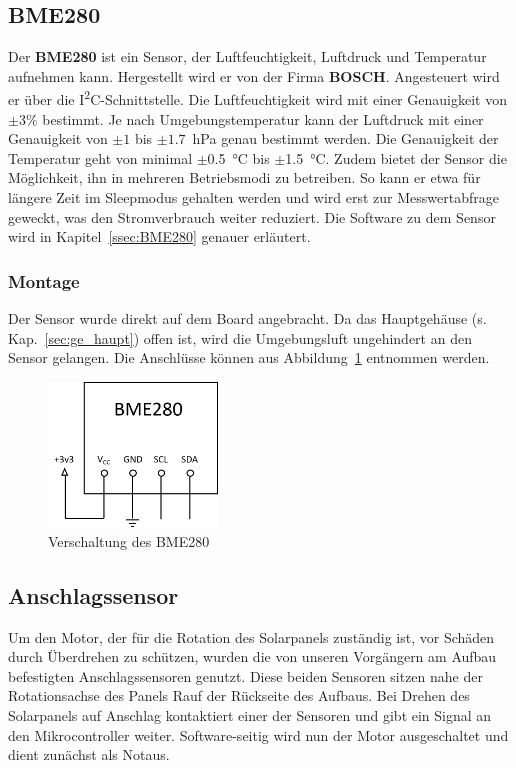 \subsection{BME280}
Der \textbf{BME280} ist ein Sensor, der Luftfeuchtigkeit, Luftdruck und Temperatur aufnehmen kann. Hergestellt wird er von der Firma \textbf{BOSCH}. Angesteuert wird er über die I\textsuperscript{2}C-Schnittstelle. Die Luftfeuchtigkeit wird mit einer Genauigkeit von $\pm3\%$ bestimmt. Je nach Umgebungstemperatur kann der Luftdruck mit einer Genauigkeit von $\pm1$ bis $\pm1.7$~hPa genau bestimmt werden. Die Genauigkeit der Temperatur geht von minimal $\pm$\SI{0.5}{\celsius} bis $\pm$\SI{1.5}{\celsius}. Zudem bietet der Sensor die Möglichkeit, ihn in mehreren Betriebsmodi zu betreiben. So kann er etwa für längere Zeit im Sleepmodus gehalten werden und wird erst zur Messwertabfrage geweckt, was den Stromverbrauch weiter reduziert. Die Software zu dem Sensor wird in Kapitel~\ref{ssec:BME280} genauer erläutert.\cite{BME280_Manual}

\subsubsection{Montage}
Der Sensor wurde direkt auf dem Board angebracht. Da das Hauptgehäuse (s. Kap.~\ref{sec:ge_haupt}) offen ist, wird die Umgebungsluft ungehindert an den Sensor gelangen. Die Anschlüsse können aus Abbildung~\ref{fig:BME280_Plan} entnommen werden.

\begin{figure}[H]
  \centering
  \includegraphics[width=0.4\textwidth]{./img/BME280_Plan.png}
  \caption{Verschaltung des BME280}\label{fig:BME280_Plan}
\end{figure}

\subsection{Anschlagssensor}
Um den Motor, der für die Rotation des Solarpanels zuständig ist, vor Schäden durch Überdrehen zu schützen, wurden die von unseren Vorgängern am Aufbau befestigten Anschlagssensoren genutzt. Diese beiden Sensoren sitzen nahe der Rotationsachse des Panels Rauf der Rückseite des Aufbaus. Bei Drehen des Solarpanels auf Anschlag kontaktiert einer der Sensoren und gibt ein Signal an den Mikrocontroller weiter. Software-seitig wird nun der Motor ausgeschaltet und dient zunächst als Notaus.

